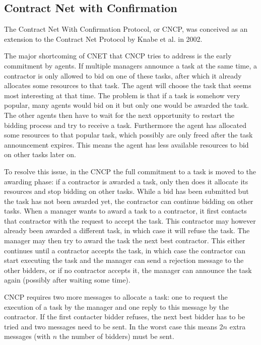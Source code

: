 \documentclass[10pt,a4paper]{article}
\begin{document}
\subsection{Contract Net with Confirmation} 
The Contract Net With Confirmation Protocol, or CNCP, was conceived as an extension to the Contract Net Protocol by Knabe et al. in 2002. \cite{CNCP}

The major shortcoming of CNET that CNCP tries to address is the early commitment by agents. If multiple managers announce a task at the same time, a contractor is only allowed to bid on one of these tasks, after which it already allocates some resources to that task. The agent will choose the task that seems most interesting at that time. The problem is that if a task is somehow very popular, many agents would bid on it but only one would be awarded the task. The other agents then have to wait for the next opportunity to restart the bidding process and try to receive a task. Furthermore the agent has allocated some resources to that popular task, which possibly are only freed after the task announcement expires. This means the agent has less available resources to bid on other tasks later on.

To resolve this issue, in the CNCP the full commitment to a task is moved to the awarding phase: if a contractor is awarded a task, only then does it allocate its resources and stop bidding on other tasks. While a bid has been submitted but the task has not been awarded yet, the contractor can continue bidding on other tasks. When a manager wants to award a task to a contractor, it first contacts that contractor with the request to accept the task. This contractor may however already been awarded a different task, in which case it will refuse the task. The manager may then try to award the task the next best contractor. This either continues until a contractor accepts the task, in which case the contractor can start executing the task and the manager can send a rejection message to the other bidders, or if no contractor accepts it, the manager can announce the task again (possibly after waiting some time).

CNCP requires two more messages to allocate a task: one to request the execution of a task by the manager and one reply to this message by the contractor. If the first contacter bidder refuses, the next best bidder has to be tried and two messages need to be sent. In the worst case this means 2$n$ extra messages (with $n$ the number of bidders) must be sent.
\end{document}
